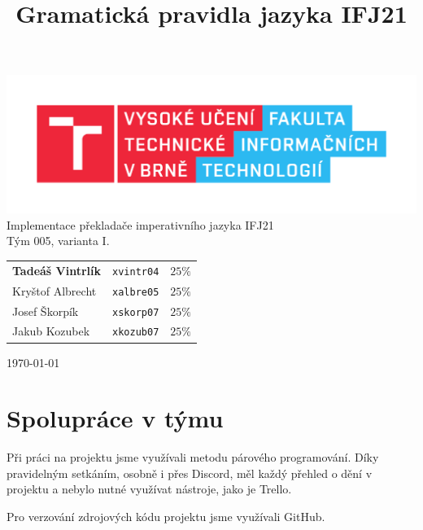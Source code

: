 \documentclass[a4paper]{article}
\title{Gramatická pravidla jazyka IFJ21}
\theoremstyle{definition}
\begin{document}
	
\begin{titlepage}
	\begin{center}
	\includegraphics[width=\linewidth]{inc/FIT_logo.pdf}\\
	{\Huge
		Implementace překladače imperativního jazyka IFJ21\\[0.5em] Tým 005, varianta I.
	}\\
	\begin{minipage}{0.6\linewidth}
		\begin{center}
		\Large
		\begin{tabular}{l c r}
			\textbf{Tadeáš Vintrlík} & \texttt{xvintr04} & $25\%$ \\
			Kryštof Albrecht & \texttt{xalbre05} & $25\%$ \\
			Josef Škorpík & \texttt{xskorp07} & $25\%$ \\
			Jakub Kozubek & \texttt{xkozub07} & $25\%$ \\
		\end{tabular}
		\end{center}
	\end{minipage}
	\end{center}
	\vfill
	\today
\end{titlepage}

\newpage

\tableofcontents

\newpage

\section{Spolupráce v týmu}

Při práci na projektu jsme využívali metodu párového programování. Díky pravidelným setkáním, osobně i přes Discord, měl každý přehled o dění v projektu a nebylo nutné využívat nástroje, jako je Trello.

Pro verzování zdrojových kódu projektu jsme využívali GitHub.
\end{document}
